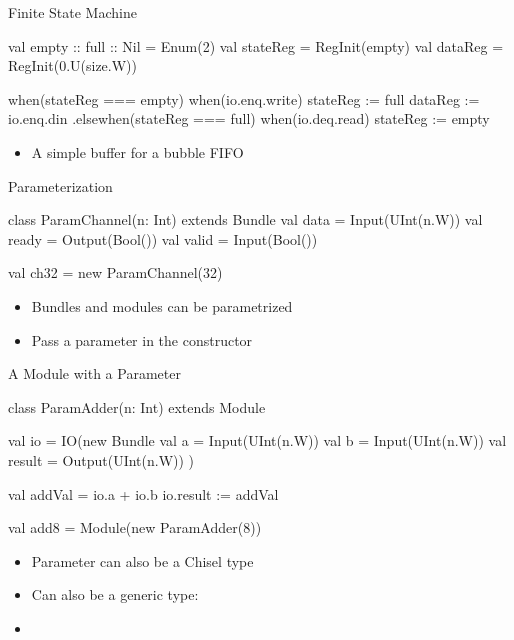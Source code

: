 \begin{frame}[fragile]{Finite State Machine}
\begin{chisel}
  val empty :: full :: Nil = Enum(2)
  val stateReg = RegInit(empty)
  val dataReg = RegInit(0.U(size.W))

  when(stateReg === empty) {
    when(io.enq.write) {
      stateReg := full
      dataReg := io.enq.din
    }
  }.elsewhen(stateReg === full) {
    when(io.deq.read) {
      stateReg := empty
    }
  }
\end{chisel}
\begin{itemize}
\item A simple buffer for a bubble FIFO
\end{itemize}
\end{frame}

\begin{frame}[fragile]{Parameterization}
\begin{chisel}
class ParamChannel(n: Int) extends Bundle {
  val data = Input(UInt(n.W))
  val ready = Output(Bool())
  val valid = Input(Bool())
}

val ch32 = new ParamChannel(32)
\end{chisel}
\begin{itemize}
\item Bundles and modules can be parametrized
\item Pass a parameter in the constructor
\end{itemize}

\end{frame}
\begin{frame}[fragile]{A Module with a Parameter}
\begin{chisel}
class ParamAdder(n: Int) extends Module {
  val io = IO(new Bundle {
    val a = Input(UInt(n.W))
    val b = Input(UInt(n.W))
    val result = Output(UInt(n.W))
  })

  val addVal = io.a + io.b
  io.result := addVal
}

val add8 = Module(new ParamAdder(8))
\end{chisel}
\begin{itemize}
\item Parameter can also be a Chisel type
\item Can also be a generic type:
\item {}
\end{itemize}
\end{frame}

